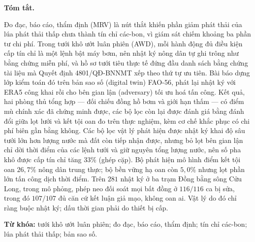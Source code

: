   \vspace{6pt}
  \begin{hujosabstract}
  \noindent\textbf{Tóm tắt.}

 Đo đạc, báo cáo, thẩm định (MRV) là nút thắt khiến phần giảm phát thải của lúa phát thải
 thấp chưa thành tín chỉ các-bon, vì giám sát chiếm khoảng ba phần tư chi
 phí. Trong tưới khô ướt luân phiên (AWD), mỗi hành động đủ điều kiện cấp
 tín chỉ là một lệnh bật máy bơm, nên nhật ký nông dân tự ghi trông như bằng chứng miễn phí, và hồ sơ tưới tiêu thực tế đứng đầu danh sách bằng chứng tài liệu mà Quyết định 4801/QĐ-BNNMT xếp theo thứ tự ưu tiên. Bài báo dựng lớp
 kiểm toán đó trên bản sao số (digital twin) FAO-56, phát lại nhật ký với ERA5 công khai rồi cho bên gian lận (adversary) tối ưu hoá tấn công. Kết quả, hai phòng thủ tổng hợp --- đối chiếu đồng hồ bơm và giới hạn thấm --- có điểm mù
chính xác đã chứng minh được, các bộ lọc còn lại được đánh giá bằng đánh đổi giữa lọt lưới
và kết tội oan đo trên thực nghiệm, kèm cơ chế khắc phục có chi phí biên gần bằng không. Các bộ lọc vật lý phát hiện được nhật ký khai độ sâu tưới lớn hơn lượng nước mà đất
còn tiếp nhận được, nhưng bỏ lọt bên gian lận chỉ dời thời điểm của các lệnh tưới và giữ
nguyên tổng lượng nước, nên số pha khô được cấp tín chỉ tăng $33\%$ (ghép cặp). Bộ phát hiện mô hình điểm
 kết tội oan $26{,}7\%$ nông dân trung thực; bộ bền vững hạ oan còn $5{,}0\%$ nhưng lọt phần
 lớn tấn công dịch thời điểm. Trên $281$ nhật ký ở ba trạm Đồng bằng sông Cửu Long, trong mô phỏng, phép neo đối soát mọi bất đồng ở $116/116$ ca bị sửa, trong đó $107/107$ đủ căn cứ
 kết luận giả mạo, không oan ai. Vật lý do đó chỉ ràng buộc nhật ký; dấu thời gian
 phải do thiết bị cấp.

\noindent\textbf{Từ khóa:} tưới khô ướt luân phiên; đo đạc, báo cáo, thẩm định; tín chỉ
  các-bon; lúa phát thải thấp; bản sao số.

  \vspace{10pt}
  \end{hujosabstract}
\endgroup

\vspace{10pt}
\begingroup

